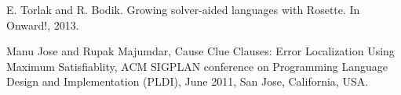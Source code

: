 \documentclass[a4paper, 12pt, notitlepage] {article}
\begin{document}
\begin{thebibliography}{unsrt}
	
	E. Torlak and R. Bodik. Growing solver-aided languages with Rosette. In Onward!, 2013.
	
	Manu Jose and Rupak Majumdar, Cause Clue Clauses: Error Localization Using Maximum Satisfiablity, ACM SIGPLAN conference on Programming Language Design and Implementation (PLDI), June 2011, San Jose, California, USA.
	
\end{thebibliography}
\end{document}
